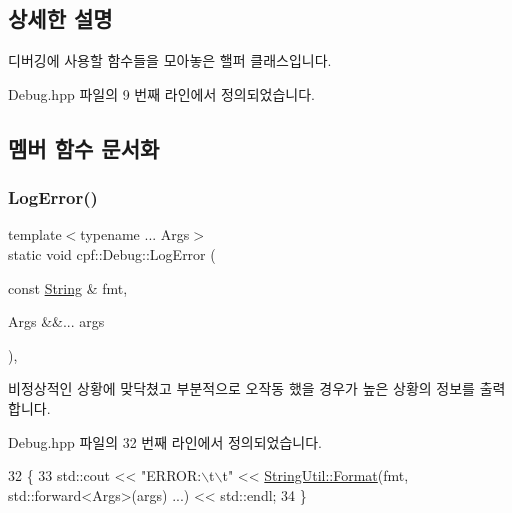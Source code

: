 \subsection{상세한 설명}
디버깅에 사용할 함수들을 모아놓은 핼퍼 클래스입니다. 

Debug.\+hpp 파일의 9 번째 라인에서 정의되었습니다.



\subsection{멤버 함수 문서화}
\mbox{\label{classcpf_1_1_debug_a3c867b9c24006a8b45b661b35efea6d2}} 
\subsubsection{\texorpdfstring{Log\+Error()}{LogError()}}
{\footnotesize\ttfamily template$<$typename ... Args$>$ \\
static void cpf\+::\+Debug\+::\+Log\+Error (\begin{DoxyParamCaption}\item[{const \hyperlink{namespacecpf_a4dbd6992c3ed4440ce7ed8982ff7ffea}{String} \&}]{fmt,  }\item[{Args \&\&...}]{args }\end{DoxyParamCaption})\hspace{0.3cm}{\ttfamily [inline]}, {\ttfamily [static]}}

비정상적인 상황에 맞닥쳤고 부분적으로 오작동 했을 경우가 높은 상황의 정보를 출력합니다. 

Debug.\+hpp 파일의 32 번째 라인에서 정의되었습니다.


\begin{DoxyCode}
32                                                                \{
33             std::cout << \textcolor{stringliteral}{"ERROR:\(\backslash\)t\(\backslash\)t"} << \hyperlink{classcpf_1_1_string_util_a965cca44ea396f01f2f3c5e3851f1001}{StringUtil::Format}(fmt, std::forward<Args>(args)
      ...) << std::endl;
34         \}
\end{DoxyCode}
\mbox{\label{classcpf_1_1_debug_a22849847c74bcb444922c263c9ae6183}} 
